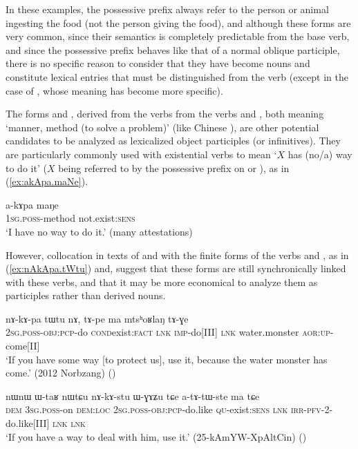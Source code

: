 In these examples, the possessive prefix always refer to the person or animal ingesting the food (not the person giving the food), and although these forms are very common, since their semantics is completely predictable from the base verb, and since the possessive prefix behaves like that of a normal oblique participle, there is no specific reason to consider that they have become nouns and constitute lexical entries that must be distinguished from the verb (except in the case of , whose meaning has become more specific).

The forms  and , derived from the verbs from the verbs  and , both meaning `manner, method (to solve a problem)' (like Chinese ), are other potential candidates to be analyzed as lexicalized object participles (or infinitives).  They are particularly commonly used with existential verbs to mean `$X$ has (no/a) way to do it' ($X$ being referred to by the possessive prefix on  or ), as in (\ref{ex:akApa.maNe}).

\begin{exe}
\ex \label{ex:akApa.maNe}
\gll a-kɤpa maŋe \\
\textsc{1sg}.\textsc{poss}-method not.exist:\textsc{sens} \\
\glt `I have no way to do it.' (many attestations)
\end{exe}
 
However, collocation in texts of  and  with the finite forms of the verbs  and , as in (\ref{ex:nAkApa.tWtu}) and, suggest that these forms are still synchronically linked with these verbs, and that it may be more economical to analyze them as participles rather than derived nouns.
 
 \begin{exe}
\ex \label{ex:nAkApa.tWtu}
\gll  nɤ-kɤ-pa tɯ\redp{}tu nɤ,  tɤ-pe ma mtsʰoʁlaŋ tɤ-ɣe  \\
\textsc{2sg}.\textsc{poss}-\textsc{obj}:\textsc{pcp}-do \textsc{cond}\redp{}exist:\textsc{fact} \textsc{lnk} \textsc{imp}-do[III] \textsc{lnk} water.monster \textsc{aor}:\textsc{up}-come[II] \\
\glt `If you have some way [to protect us], use it, because the water monster has come.' (2012 Norbzang) 	()
 \end{exe}
 
  \begin{exe}
\ex \label{ex:nAkAstu.WGAZu}
\gll   nɯnɯ ɯ-taʁ nɯtɕu nɤ-kɤ-stu ɯ-ɣɤʑu tɕe a-tɤ-tɯ-ste ma tɕe \\
\textsc{dem} \textsc{3sg}.\textsc{poss}-on \textsc{dem}:\textsc{loc} \textsc{2sg}.\textsc{poss}-\textsc{obj}:\textsc{pcp}-do.like \textsc{qu}-exist:\textsc{sens} \textsc{lnk} \textsc{irr}-\textsc{pfv}-2-do.like[III] \textsc{lnk} \textsc{lnk} \\
\glt `If you have a way to deal with him, use it.'   (25-kAmYW-XpAltCin)
()
 \end{exe}
 
